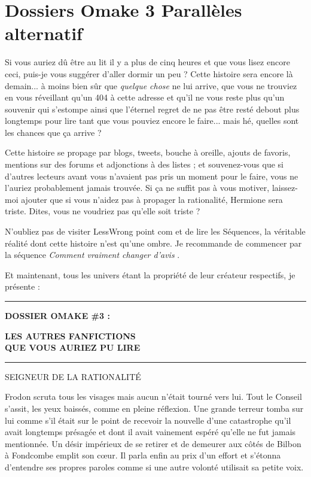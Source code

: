 
\chapter{Dossiers Omake 3   Parallèles alternatif}

Si vous auriez dû être au lit il y a plus de cinq heures et que vous lisez encore ceci, puis-je vous suggérer d'aller dormir un peu ? Cette histoire sera encore là demain... à moins bien sûr que \emph{quelque chose}  ne lui arrive, que vous ne trouviez en vous réveillant qu'un 404 à cette adresse et qu'il ne vous reste plus qu'un souvenir qui s'estompe ainsi que l'éternel regret de ne pas être resté debout plus longtemps pour lire tant que vous pouviez encore le faire... mais hé, quelles sont les chances que ça arrive ?

Cette histoire se propage par blogs, tweets, bouche à oreille, ajouts de favoris, mentions sur des forums et adjonctions à des listes ; et souvenez-vous que si d'autres lecteurs avant vous n'avaient pas pris un moment pour le faire, vous ne l'auriez probablement jamais trouvée. Si ça ne suffit pas à vous motiver, laissez-moi ajouter que si vous n'aidez pas à propager la rationalité, Hermione sera triste. Dites, vous ne voudriez pas qu'elle soit triste ?

N'oubliez pas de visiter LessWrong point com et de lire les Séquences, la véritable réalité dont cette histoire n'est qu'une ombre. Je recommande de commencer par la séquence \emph{Comment vraiment changer d'avis} .

Et maintenant, tous les univers étant la propriété de leur créateur respectifs, je présente :
\par\noindent\rule{\textwidth}{0.4pt}

\begin{center}\textbf{DOSSIER OMAKE \#3 :} \end{center}



\begin{center}\textbf{LES AUTRES FANFICTIONS} \\\textbf{QUE VOUS AURIEZ PU LIRE} \end{center}

\par\noindent\rule{\textwidth}{0.4pt}

\begin{center}SEIGNEUR DE LA RATIONALITÉ\end{center}


Frodon scruta tous les visages mais aucun n'était tourné vers lui. Tout le Conseil s'assit, les yeux baissés, comme en pleine réflexion. Une grande terreur tomba sur lui comme s'il était sur le point de recevoir la nouvelle d'une catastrophe qu'il avait longtemps présagée et dont il avait vainement espéré qu'elle ne fut jamais mentionnée. Un désir impérieux de se retirer et de demeurer aux côtés de Bilbon à Fondcombe emplit son cœur. Il parla enfin au prix d'un effort et s'étonna d'entendre ses propres paroles comme si une autre volonté utilisait sa petite voix.

